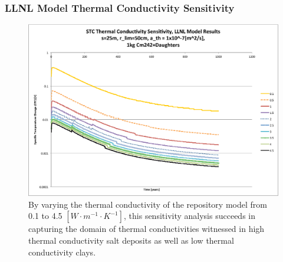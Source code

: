 

\begin{frame}[ctb!]
\frametitle{LLNL Model Thermal Conductivity Sensitivity}
\begin{figure}[htbp!]
\begin{center}
\includegraphics[height=0.7\textheight]{./thermal_demonstration/conductivity/Cm242kth_alpha_low.eps}
\end{center}
\caption[$K_{th}$ Sensitivity for Low $\alpha_{th}$ in LLNL Model]{
By varying the thermal conductivity of the repository model from 0.1 to 4.5 
$[W\cdot m^{-1} \cdot K^{-1}]$, this sensitivity analysis succeeds in capturing 
the domain of thermal conductivities witnessed in high thermal conductivity 
salt deposits as well as low thermal conductivity clays.}
\label{fig:Cm242Kth_alpha_low}
\end{figure}

\end{frame}


